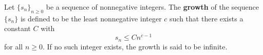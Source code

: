 Let $\{s_n\}_{n \geq 0}$ be a sequence of nonnegative integers. The \textbf{growth} of the sequence $\{s_n\}$ is defined to be the least nonnegative integer $c$ such that there exists a constant $C$ with
$$s_n \leq C n^{c-1}$$
for all $n \geq 0$. If no such integer exists, the growth is said to be infinite.
